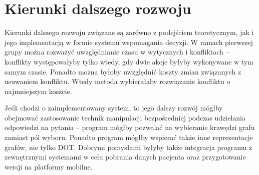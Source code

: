 \section{Kierunki dalszego rozwoju}
Kierunki dalszego rozwoju związane są zarówno z podejściem teoretycznym, jak i jego implementacją w formie systemu wspomagania decyzji. W ramach pierwszej grupy można rozważyć uwzględnianie czasu w wytycznych i konfliktach -- konflikty występowałyby tylko wtedy, gdy dwie akcje byłyby wykonywane w tym samym czasie. Ponadto można byłoby uwzględnić koszty zmian związanych z usuwaniem konfliktu. Wtedy metoda wybierałaby rozwiązanie konfliktu o najmniejszym koszcie. 

Jeśli chodzi o zaimplementowany system, to jego dalszy rozwój mógłby obejmować zastosowanie technik manipulacji bezpośredniej podczas udzielania odpowiedzi na pytania -- program mógłby pozwalać na wybieranie krawędzi grafu zamiast pól wyboru. Ponadto program mógłby wspierać także inne reprezentacje grafów, nie tylko DOT. Dobrymi pomysłami byłyby także integracja programu z zewnętrznymi systemami w celu pobrania danych pacjenta oraz przygotowanie wersji na platformy mobilne.



